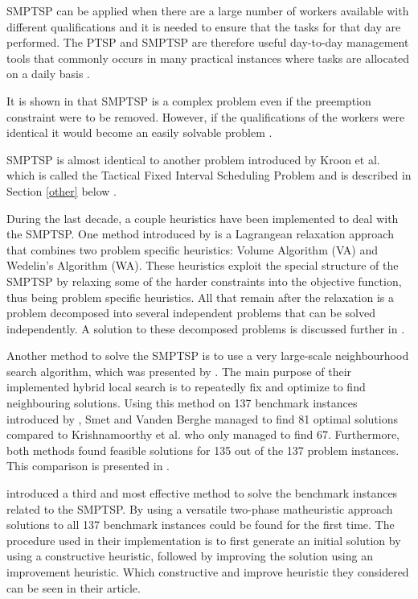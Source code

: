 SMPTSP can be applied when there are a large number of workers available with different qualifications and it is needed to ensure that the tasks for that day are performed. The PTSP and SMPTSP are therefore useful day-to-day management tools that commonly occurs in many practical instances where tasks are allocated on a daily basis \citet{krishnamoorthy_2012}.

It is shown in \citet{kroon_1995} that SMPTSP is a complex problem even if the preemption constraint were to be removed. However, if the qualifications of the workers were identical it would become an easily solvable problem \citet{krishnamoorthy_2012}.

SMPTSP is almost identical to another problem introduced by Kroon et al. which is called the Tactical Fixed Interval Scheduling Problem and is described in Section \ref{other} below \citet{krishnamoorthy_2012}.

During the last decade, a couple heuristics have been implemented to deal with the SMPTSP. One method introduced by \citet{krishnamoorthy_2012} is a Lagrangean relaxation approach that combines two problem specific heuristics: Volume Algorithm (VA) and Wedelin's Algorithm (WA). These heuristics exploit the special structure of the SMPTSP by relaxing some of the harder constraints into the objective function, thus being problem specific heuristics. All that remain after the relaxation is a problem decomposed into several independent problems that can be solved independently. A solution to these decomposed problems is discussed further in \citet{krishnamoorthy_2012}.

Another method to solve the SMPTSP is to use a very large-scale neighbourhood search algorithm, which was presented by \citet{smet_2012}. The main purpose of their implemented hybrid local search is to repeatedly fix and optimize to find neighbouring solutions. Using this method on 137 benchmark instances introduced by \citet{krishnamoorthy_2012}, Smet and Vanden Berghe managed to find 81 optimal solutions compared to Krishnamoorthy et al. who only managed to find 67. Furthermore, both methods found feasible solutions for 135 out of the 137 problem instances. This comparison is presented in \citet{smet_2014}.

\citet{smet_2014} introduced a third and most effective method to solve the benchmark instances related to the SMPTSP. By using a versatile two-phase matheuristic approach solutions to all 137 benchmark instances could be found for the first time. The procedure used in their implementation is to first generate an initial solution by using a constructive heuristic, followed by improving the solution using an improvement heuristic. Which constructive and improve heuristic they considered can be seen in their article.


